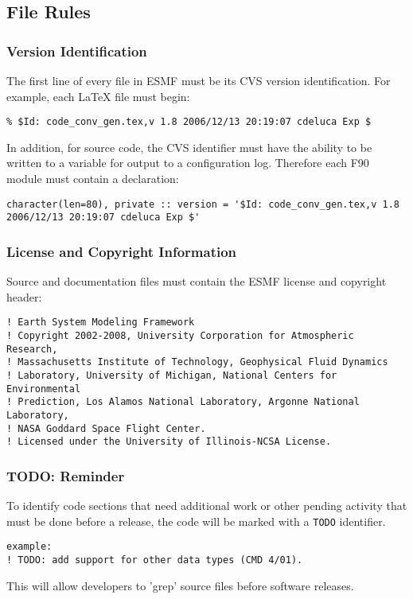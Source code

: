 \subsection{File Rules} 

\subsubsection{Version Identification} 
The first line of every file in ESMF
  must be its CVS version identification. For example, each \LaTeX
  file must begin:
\begin{verbatim}
% $Id: code_conv_gen.tex,v 1.8 2006/12/13 20:19:07 cdeluca Exp $ 
\end{verbatim}

In addition, for source code, the CVS identifier must have the 
ability to be written to a variable for output to a configuration log.  
Therefore each F90 module must contain a declaration:
\begin{verbatim}
character(len=80), private :: version = '$Id: code_conv_gen.tex,v 1.8 2006/12/13 20:19:07 cdeluca Exp $'
\end{verbatim}

\subsubsection{License and Copyright Information}

Source and documentation files must contain the ESMF license and 
copyright header:

\begin{verbatim}
! Earth System Modeling Framework
! Copyright 2002-2008, University Corporation for Atmospheric Research,
! Massachusetts Institute of Technology, Geophysical Fluid Dynamics
! Laboratory, University of Michigan, National Centers for Environmental
! Prediction, Los Alamos National Laboratory, Argonne National Laboratory,
! NASA Goddard Space Flight Center.
! Licensed under the University of Illinois-NCSA License.
\end{verbatim}

\subsubsection{TODO: Reminder} 
To identify code sections that need
additional work or other pending activity that must be done before a release,
the code will be marked with a {\tt TODO} identifier. 
\begin{verbatim}
example:
! TODO: add support for other data types (CMD 4/01).
\end{verbatim}
This will allow developers to 'grep' source files before software releases. 


